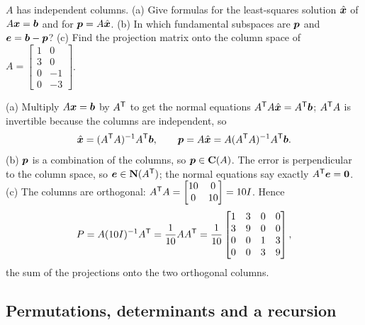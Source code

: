 \begin{exercise}[Question 8]\label{exr:u40-q8}
$A$ has independent columns.
(a) Give formulas for the least-squares solution $\hat{\boldsymbol{x}}$ of $A\boldsymbol{x}=\boldsymbol{b}$ and for $\boldsymbol{p}=A\hat{\boldsymbol{x}}$.
(b) In which fundamental subspaces are $\boldsymbol{p}$ and $\boldsymbol{e}=\boldsymbol{b}-\boldsymbol{p}$?
(c) Find the projection matrix onto the column space of $A=\begin{bmatrix}1&0\\3&0\\0&-1\\0&-3\end{bmatrix}$.
\end{exercise}
\begin{solution}
(a) Multiply $A\boldsymbol{x}=\boldsymbol{b}$ by $A^{\mathsf{T}}$ to get the normal equations $A^{\mathsf{T}} A\hat{\boldsymbol{x}}=A^{\mathsf{T}}\boldsymbol{b}$; $A^{\mathsf{T}} A$ is invertible because the columns are independent, so
\[
\hat{\boldsymbol{x}}=(A^{\mathsf{T}} A)^{-1}A^{\mathsf{T}}\boldsymbol{b},\qquad \boldsymbol{p}=A\hat{\boldsymbol{x}}=A(A^{\mathsf{T}} A)^{-1}A^{\mathsf{T}}\boldsymbol{b}.
\]
(b) $\boldsymbol{p}$ is a combination of the columns, so $\boldsymbol{p}\in\mathbf{C}(A)$. The error is perpendicular to the column space, so $\boldsymbol{e}\in\mathbf{N}(A^{\mathsf{T}})$; the normal equations say exactly $A^{\mathsf{T}}\boldsymbol{e}=\boldsymbol{0}$.
(c) The columns are orthogonal: $A^{\mathsf{T}} A=\begin{bmatrix}10&0\\0&10\end{bmatrix}=10I$. Hence
\[
P=A(10I)^{-1}A^{\mathsf{T}}=\frac{1}{10}AA^{\mathsf{T}}=\frac{1}{10}\begin{bmatrix}1&3&0&0\\3&9&0&0\\0&0&1&3\\0&0&3&9\end{bmatrix},
\]
the sum of the projections onto the two orthogonal columns.
\end{solution}

\subsection{Permutations, determinants and a recursion}

